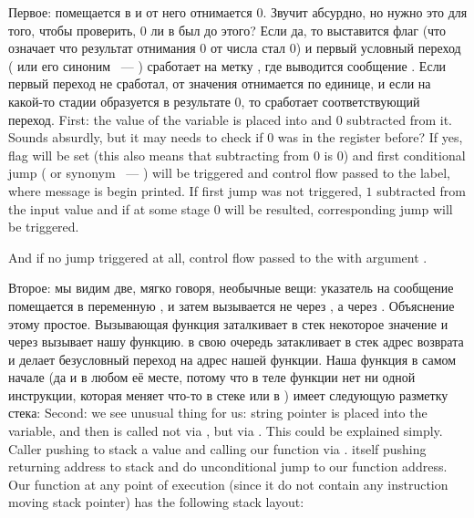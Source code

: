 \IFRU
{Первое:  помещается в \EAX и от него отнимается 0. Звучит абсурдно, но нужно это для того, чтобы проверить, 
0 ли в \EAX был до этого? Если да, то выставится флаг \ZF (что означает что результат отнимания $0$ от числа 
стал $0$) и первый условный переход \JE ( или его синоним \JZ ~--- ) 
сработает на метку , где выводится сообщение .
Если первый переход не сработал, от значения отнимается по единице, 
и если на какой-то стадии образуется в результате $0$, то сработает соответствующий переход.}
{First: the value of the  variable is placed into \EAX and $0$ subtracted from it. Sounds absurdly, but it may needs to check if 
$0$ was in the \EAX register before? If yes, flag \ZF will be set (this also means that subtracting from $0$ is $0$) 
and first conditional jump \JE ( or synonym \JZ ~--- ) will be triggered 
and control flow passed to the  label, where  message is begin printed. 
If first jump was not triggered, $1$ subtracted from the input value and if at some stage $0$ will be resulted, 
corresponding jump will be triggered.}

{And if no jump triggered at all, control flow passed to the \printf with argument .}

\label{jump_to_last_printf}
\index{\Stack}
\IFRU
{Второе: мы видим две, мягко говоря, необычные вещи: указатель на сообщение помещается в переменную , 
и затем \printf вызывается не через \CALL, а через \JMP. Объяснение этому простое. 
Вызывающая функция заталкивает в стек некоторое значение и через \CALL вызывает нашу функцию. 
\CALL в свою очередь затакливает в стек адрес возврата и делает безусловный переход на адрес нашей функции. 
Наша функция в самом начале (да и в любом её месте, потому что в теле функции нет ни одной инструкции, 
которая меняет что-то в стеке или в \ESP) имеет следующую разметку стека:}
{Second: we see unusual thing for us: string pointer is placed into the  variable, and 
then \printf is called not via \CALL, but via \JMP. This could be explained simply. 
Caller pushing to stack a value and calling our function via \CALL. 
\CALL itself pushing returning address to stack and do unconditional jump to our function address. 
Our function at any point of execution (since it do not contain any instruction moving stack 
pointer) has the following stack layout:}

